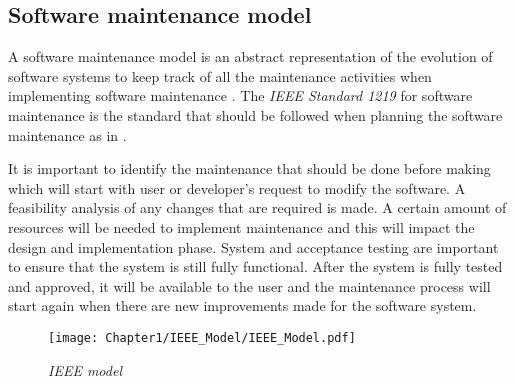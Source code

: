 \subsection{Software maintenance model}
A software maintenance model is an abstract representation of the evolution of software systems to keep track of all the maintenance activities when implementing software maintenance \cite{Ren2011}. The \textit{IEEE Standard 1219} for software maintenance is the standard that should be followed when planning the software maintenance as in .\par It is important to identify the maintenance that should be done before making which will start with user or developer's request to modify the software. A feasibility analysis of any changes that are required is made. A certain amount of resources will be needed to implement maintenance and this will impact the design and implementation phase. System and acceptance testing are important to ensure that the system is still fully functional. After the system is fully tested and approved, it will be available to the user and the maintenance process will start again when there are new improvements made for the software system.

\begin{figure}[!htb] %
	\centering %
	\texttt{[image: Chapter1/IEEE\_Model/IEEE\_Model.pdf]}
	\caption[IEEE model]
	{\textit{IEEE model \cite{Ren2011}}} \label{fig:CH1_IEEE_Model}
\end{figure}

